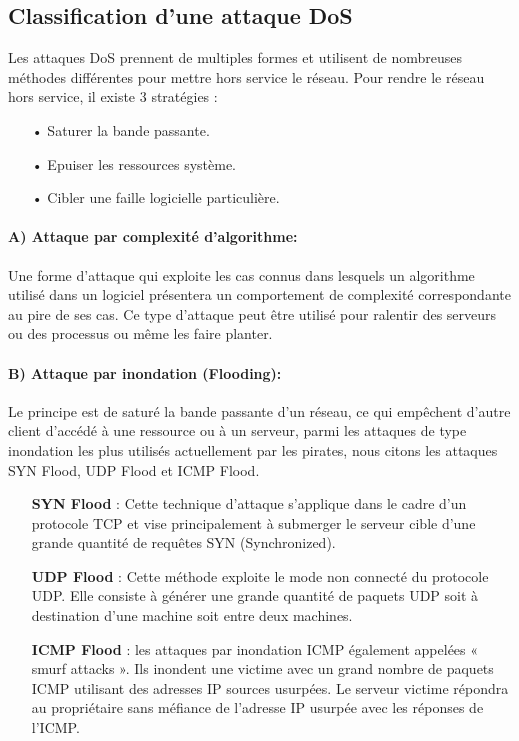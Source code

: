 \subsection{Classification d'une attaque DoS}
Les attaques DoS prennent de multiples formes et utilisent de nombreuses méthodes différentes pour mettre hors service le réseau.
Pour rendre le réseau hors service, il existe 3 stratégies :\\
\begin{itemize}
\item[•]Saturer la bande passante.
\item[•]Epuiser les ressources système.
\item[•]Cibler une faille logicielle particulière.
\end{itemize} 

\paragraph{A) Attaque par complexité d’algorithme:}
Une forme d’attaque qui exploite les cas connus dans lesquels un algorithme utilisé dans un logiciel présentera un comportement de complexité correspondante au pire de ses cas. Ce type d’attaque peut être utilisé pour ralentir des serveurs ou des processus ou même les faire planter. 
\paragraph{B) Attaque par inondation (Flooding):}
Le principe est de saturé la bande passante d’un réseau, ce qui empêchent d’autre client d’accédé à une ressource ou à un serveur, parmi les attaques de type inondation les plus utilisés actuellement par les pirates, nous citons les attaques SYN Flood, UDP Flood et ICMP Flood.\\
\begin{itemize}
\item[\textbf{SYN Flood}]: Cette technique d’attaque s’applique dans le cadre d’un protocole TCP et vise principalement à submerger le serveur cible d’une grande quantité de requêtes SYN (Synchronized).\\
\item[\textbf{UDP Flood}]: Cette méthode exploite le mode non connecté du protocole UDP. Elle consiste à générer une grande quantité de paquets UDP soit à destination d’une machine soit entre deux machines.\\
\item[\textbf{ICMP Flood}]: les attaques par inondation ICMP également appelées « smurf attacks ». Ils inondent une victime avec un grand nombre de paquets ICMP utilisant des adresses IP sources usurpées. Le serveur victime répondra au propriétaire sans méfiance de l'adresse IP usurpée avec les réponses de l'ICMP.
\end{itemize}

